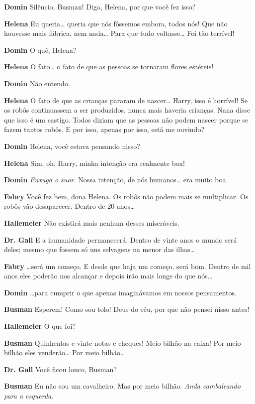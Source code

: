 \textbf{Domin} Silêncio, Busman! Diga, Helena, por que você fez isso?

\textbf{Helena} Eu queria\ldots{} queria que nós fôssemos embora, todos nós! Que não
houvesse mais fábrica, nem nada\ldots{} Para que tudo voltasse\ldots{} Foi tão
terrível!

\textbf{Domin} O quê, Helena?

\textbf{Helena} O fato\ldots{} o fato de que as pessoas se tornaram flores estéreis!

\textbf{Domin} Não entendo.

\textbf{Helena} O fato de que as crianças pararam de nascer\ldots{} Harry, isso é 
horrível! Se os robôs continuassem a ser produzidos, nunca mais haveria crianças.
Nana disse que isso é um castigo. Todos diziam que as pessoas não podem
nascer porque se fazem tantos robôs. E por isso, apenas por isso, está me
ouvindo?

\textbf{Domin} Helena, você estava pensando nisso?

\textbf{Helena} Sim, oh, Harry, minha intenção era realmente boa!

\textbf{Domin} \emph{Enxuga o suor.} Nossa intenção, de nós humanos\ldots{} era muito
boa.

\textbf{Fabry} Você fez bem, dona Helena. Os robôs não podem mais se multiplicar. Os
robôs vão desaparecer. Dentro de 20 anos\ldots{}

\textbf{Hallemeier} Não existirá mais nenhum desses miseráveis.

\textbf{Dr. Gall} E a humanidade permanecerá. Dentro de vinte anos o mundo será deles;
mesmo que fossem só uns selvagens na menor das ilhas\ldots{}

\textbf{Fabry} \ldots{}será um começo. E desde que haja um começo, será bom. Dentro de mil
anos eles poderão nos alcançar e depois irão mais longe do que nós\ldots{}

\textbf{Domin} \ldots{}para cumprir o que apenas imaginávamos em nossos pensamentos.

\textbf{Busman} Esperem! Como sou tolo! Deus do céu, por que não pensei nisso
antes!

\textbf{Hallemeier} O que foi?

\textbf{Busman} Quinhentas e vinte notas e cheques! Meio bilhão na caixa! Por meio
bilhão eles venderão\ldots{} Por meio bilhão\ldots{}

\textbf{Dr. Gall} Você ficou louco, Busman?

\textbf{Busman} Eu não sou um cavalheiro. Mas por meio bilhão. \emph{Anda cambaleando
para a esquerda.}

